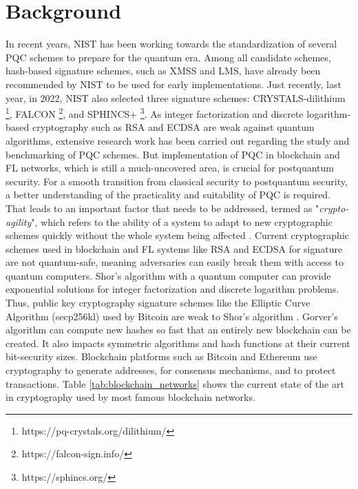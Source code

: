 \section{Background}
In recent years, NIST has been working towards the standardization
of several PQC schemes to prepare for the quantum era.
Among all candidate schemes, hash-based signature schemes, such as XMSS and LMS, have already been recommended by NIST to be used for early implementations.
Just recently, last year, in 2022, NIST also selected three signature schemes: CRYSTALS-dilithium \footnote{https://pq-crystals.org/dilithium/}, FALCON \footnote{https://falcon-sign.info/}, and
SPHINCS+ \footnote{https://sphincs.org/}.
As integer factorization and discrete logarithm-based cryptography such as RSA and ECDSA are weak against quantum algorithms, 
extensive research work has been carried out regarding the study
and benchmarking of PQC schemes.
But implementation of PQC in
blockchain and FL networks, which is still a much-uncovered area, is crucial for postquantum security.
For a smooth transition from classical security to postquantum security, a better understanding of the practicality and suitability of PQC
is required.
That leads to an important factor that needs to be addressed, termed as 
"\textit{crypto-agility}", 
which refers to the ability of a system to
adapt to new cryptographic schemes quickly
without the whole system being affected \cite{wiesmaierPQCMigrationCryptoAgility2021}.
Current cryptographic schemes used in blockchain and FL systems like RSA and ECDSA for signature are not
quantum-safe, meaning adversaries can easily break them with access to quantum computers.
Shor's algorithm with a quantum computer can provide exponential solutions for integer factorization and discrete logarithm problems.
Thus, public key cryptography signature schemes like the Elliptic Curve Algorithm (secp256kl) used by Bitcoin are
weak to Shor's algorithm
\cite{alkeilanialkadriDeterministicWalletsQuantum2020,sharmaAnalysisCrystalsDilithiumBlockChain2021}. 
Gorver's algorithm can compute new hashes so fast that an entirely new blockchain can be created.
It also impacts symmetric algorithms and hash functions at their current bit-security sizes. 
Blockchain platforms such as Bitcoin and Ethereum use cryptography to generate addresses, for consensus mechanisms, and to protect transactions.
Table \ref{tab:blockchain_networks} shows the current state of the art in cryptography used by most famous blockchain networks.
